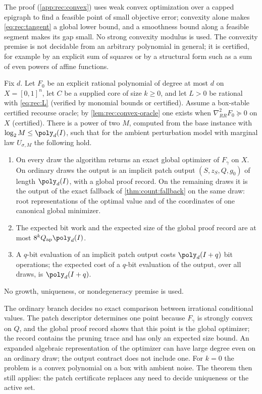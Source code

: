 The proof (\cref{app:rec:convex}) uses weak convex optimization over a capped
epigraph \citep[Definition~2.1.10 and Corollary~4.2.7]{grotschel1988-geometric-algorithms-and-combinatorial-optimization}
to find a feasible point of small objective error; convexity alone makes
\eqref{eq:rec:tangent} a global lower bound, and a smoothness bound along a
feasible segment makes its gap small. No strong convexity modulus is used.
The convexity premise is not decidable from an arbitrary polynomial in
general; it is certified, for example by an explicit sum of squares or by a
structural form such as a sum of even powers of affine functions.

\begin{theorem}\label{thm:rec:poly}
Fix $d$. Let $F_0$ be an explicit rational polynomial of degree at most $d$
on $X=[0,1]^n$, let $C$ be a supplied core of size $k\ge0$, and let $L>0$ be
rational with \eqref{eq:rec:L} (verified by monomial bounds or certified).
Assume a box-stable certified recourse oracle; by
\cref{lem:rec:convex-oracle} one exists when $\nabla^2_{RR}F_0\succeq0$ on
$X$ (certified). There is a power of two $M$, computed from the base
instance with $\log_2M\le\poly_d(I)$, such that for the ambient perturbation
model with marginal law $U_{\sigma,M}$ the following hold.
\begin{enumerate}[label=(\roman*)]
\item On every draw the algorithm returns an exact global optimizer of
$F_\gamma$ on $X$. On ordinary draws the output is an implicit patch output
$(S,z_S,Q,g_0)$ of length $\poly_d(I)$, with a global proof record. On the
remaining draws it is the output of the exact fallback of
\cref{thm:count:fallback} on the same draw: root representations of the
optimal value and of the coordinates of one canonical global minimizer.
\item The expected bit work and the expected size of the global proof
record are at most $8^kQ_{\rm ap}\poly_d(I)$.
\item A $q$-bit evaluation of an implicit patch output costs
$\poly_d(I+q)$ bit operations; the expected cost of a $q$-bit evaluation of
the output, over all draws, is $\poly_d(I+q)$.
\end{enumerate}
No growth, uniqueness, or nondegeneracy premise is used.
\end{theorem}

The ordinary branch decides no exact comparison between irrational
conditional values. The patch descriptor determines one point because
$F_\gamma$ is strongly convex on $Q$, and the global proof record shows that
this point is the global optimizer; the record contains the pruning trace and
has only an expected size bound. An expanded algebraic representation of the
optimizer can have large degree even on an ordinary draw; the output contract
does not include one. For $k=0$ the problem is a convex polynomial on a box
with ambient noise. The theorem then still applies: the patch certificate
replaces any need to decide uniqueness or the active set.

